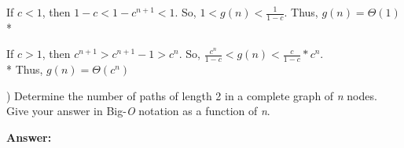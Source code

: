 \documentclass{article}
\begin{document}
\indent If $c < 1$, then $1 - c < 1 - c^{n + 1} < 1$. So, $1 < g(n) < \frac{1}{1 - c}$. Thus, $g(n) = \Theta(1)$ \\*

\indent If $c > 1$, then $c^{n + 1} > c^{n + 1} - 1 > c^n$. So, $\frac{c^n}{1 - c} < g(n) < \frac{c}{1 - c} * c^n$. \\*
\indent Thus, $g(n) = \Theta(c^n)$

\vspace{.5in}
) Determine the number of paths of length 2 in a complete graph of \textit{n} nodes.
\indent Give your answer in Big-\textit{O} notation as a function of \textit{n}.

\vspace{.1in}
{\bf Answer:}
\end{document}
